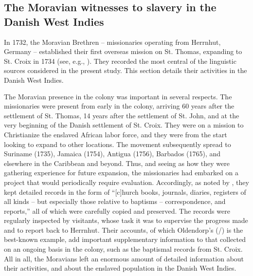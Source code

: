 \documentclass[output=paper,colorlinks,citecolor=brown]{langscibook}
\begin{document}
\subsection{The Moravian witnesses to slavery in the Danish West Indies}

In 1732, the Moravian Brethren – missionaries operating from Herrnhut, Germany – established their first overseas mission on St. Thomas, expanding to St. Croix in 1734 (see, e.g., \cite{Meier_Stein_Palmie_Ulbricht_2010}). They recorded the most central of the linguistic sources considered in the present study. This section details their activities in the Danish West Indies. 

The Moravian presence in the colony was important in several respects. The missionaries were present from early in the colony, arriving 60 years after the settlement of St. Thomas, 14 years after the settlement of St. John, and at the very beginning of the Danish settlement of St. Croix. They were on a mission to Christianize the enslaved African labor force, and they were from the start looking to expand to other locations. The movement subsequently spread to Suriname (1735), Jamaica (1754), Antigua (1756), Barbados (1765), and elsewhere in the Caribbean and beyond. Thus, and seeing as how they were gathering experience for future expansion, the missionaries had embarked on a project that would periodically require evaluation. Accordingly, as noted by \citet[141]{Highfield_1994}, they kept detailed records in the form of “[c]hurch books, journals, diaries, registers of all kinds – but especially those relative to baptisms – correspondence, and reports,” all of which were carefully copied and preserved. The records were regularly inspected by visitants, whose task it was to supervise the progress made and to report back to Herrnhut. Their accounts, of which Oldendorp's (\citeyear{Oldendorp_1777}/\citeyear{Oldendorp_2000, Oldendorp_2002}) is the best-known example, add important supplementary information to that collected on an ongoing basis in the colony, such as the baptismal records from St. Croix. All in all, the Moravians left an enormous amount of detailed information about their activities, and about the enslaved population in the Danish West Indies.
\end{document}
